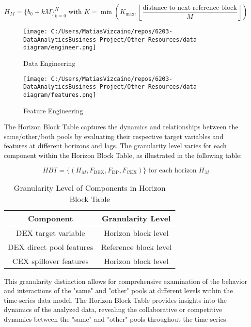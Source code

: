 \documentclass{article}
\begin{document}
\begin{equation}
H_{M} = \{b_{0}+kM\}_{k=0}^{K} \text{ with } K = \min \left( K_{\text{max}}, \left\lfloor \frac{\text{distance to next reference block}}{M} \right\rfloor \right)
\end{equation}

\begin{figure}[htbp]
\begin{minipage}{0.5\textwidth}
\centering
\texttt{[image: C:/Users/MatiasVizcaino/repos/6203-DataAnalyticsBusiness-Project/Other Resources/data-diagram/engineer.png]}
\caption{Data Engineering}
\label{fig:data-diagram-engineer}
\end{minipage}
\begin{minipage}{0.45\textwidth}
\centering
\texttt{[image: C:/Users/MatiasVizcaino/repos/6203-DataAnalyticsBusiness-Project/Other Resources/data-diagram/features.png]}
\caption{Feature Engineering}
\label{fig:data-diagram-features}
\end{minipage}
\end{figure}

The Horizon Block Table captures the dynamics and relationships between the same/other/both pools by evaluating their respective target variables and features at different horizons and lags. The granularity level varies for each component within the Horizon Block Table, as illustrated in the following table:

\begin{equation}
HBT = \{ (H_{M}, F_{\text{DEX}}, F_{\text{DP}}, F_{\text{CEX}}) \} \text{ for each horizon } H_{M} 
\end{equation}

\begin{table}[htbp]
\centering
\begin{tabular}{|c|c|}
\hline
\textbf{Component} & \textbf{Granularity Level} \\
\hline
DEX target variable & Horizon block level \\
\hline
DEX direct pool features & Reference block level \\
\hline
CEX spillover features & Horizon block level \\
\hline
\end{tabular}
\caption{Granularity Level of Components in Horizon Block Table}
\label{table:granularity}
\end{table}

This granularity distinction allows for comprehensive examination of the behavior and interactions of the "same" and "other" pools at different levels within the time-series data model. The Horizon Block Table provides insights into the dynamics of the analyzed data, revealing the collaborative or competitive dynamics between the "same" and "other" pools throughout the time series.
\end{document}
